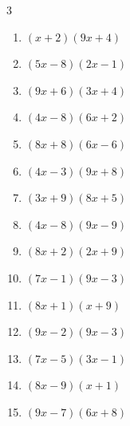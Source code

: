 \begin{multicols}{3}
\begin{enumerate}
  \item $(x+2)(9x+4)$


  \item $(5x-8)(2x-1)$


  \item $(9x+6)(3x+4)$


  \item $(4x-8)(6x+2)$


  \item $(8x+8)(6x-6)$


  \item $(4x-3)(9x+8)$


  \item $(3x+9)(8x+5)$


  \item $(4x-8)(9x-9)$


  \item $(8x+2)(2x+9)$


  \item $(7x-1)(9x-3)$


  \item $(8x+1)(x+9)$


  \item $(9x-2)(9x-3)$


  \item $(7x-5)(3x-1)$


  \item $(8x-9)(x+1)$


\columnbreak %

  \item $(9x-7)(6x+8)$


\end{enumerate}
\end{multicols}
